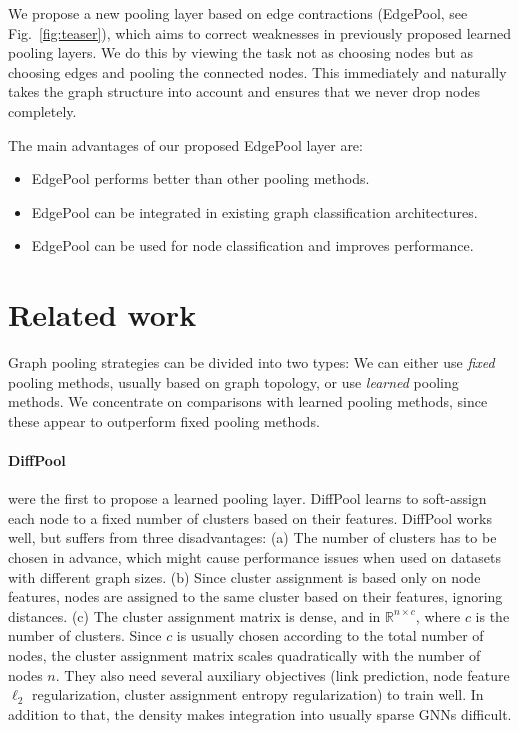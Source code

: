 \documentclass{article}
\newcommand{\figref}[1]{Fig.~\ref{#1}}
\newcommand{\edgepool}{EdgePool}
\begin{document}
We propose a new pooling layer based on edge contractions (\edgepool{}, see \figref{fig:teaser}), which aims to correct weaknesses in previously proposed learned pooling layers. We do this by viewing the task not as choosing nodes but as choosing edges and pooling the connected nodes. This immediately and naturally takes the graph structure into account and ensures that we never drop nodes completely.

The main advantages of our proposed \edgepool{} layer are:

\begin{itemize}
	\item \edgepool{} performs better than other pooling methods.
	\item \edgepool{} can be integrated in existing graph classification architectures.
	\item \edgepool{} can be used for node classification and improves performance.
\end{itemize} 
\section{Related work}

Graph pooling strategies can be divided into two types: We can either use \textit{fixed} pooling methods, usually based on graph topology, or use \textit{learned} pooling methods. We concentrate on comparisons with learned pooling methods, since these appear to outperform fixed pooling methods.

\paragraph{DiffPool} \citet{yingHierarchicalGraphRepresentation2018} were the first to propose a learned pooling layer. DiffPool learns to soft-assign each node to a fixed number of clusters based on their features. DiffPool works well, but suffers from three disadvantages: (a) The number of clusters has to be chosen in advance, which might cause performance issues when used on datasets with different graph sizes. (b) Since cluster assignment is based only on node features, nodes are assigned to the same cluster based on their features, ignoring distances. (c) The cluster assignment matrix is dense, and in $\mathbb{R}^{n\times c}$, where $c$ is the number of clusters. Since $c$ is usually chosen according to the total number of nodes, the cluster assignment matrix scales quadratically with the number of nodes $n$. They also need several auxiliary objectives (link prediction, node feature $\ell_2$ regularization, cluster assignment entropy regularization) to train well. In addition to that, the density makes integration into usually sparse \glspl{GNN} difficult.
\end{document}
